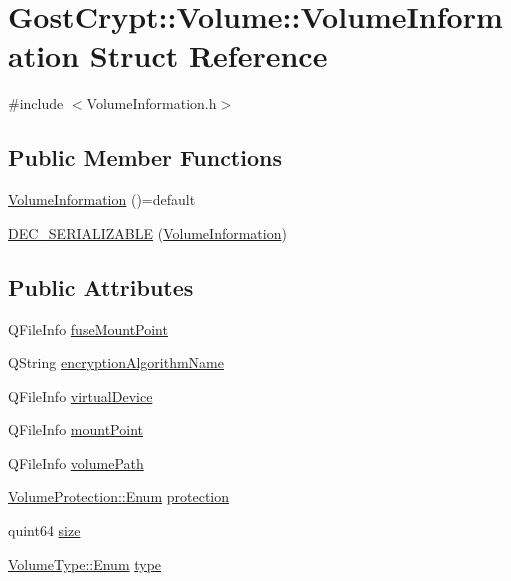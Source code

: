 \hypertarget{struct_gost_crypt_1_1_volume_1_1_volume_information}{}\section{Gost\+Crypt\+:\+:Volume\+:\+:Volume\+Information Struct Reference}
\label{struct_gost_crypt_1_1_volume_1_1_volume_information}


{\ttfamily \#include $<$Volume\+Information.\+h$>$}

\subsection*{Public Member Functions}
\begin{DoxyCompactItemize}
\item 
\hyperlink{struct_gost_crypt_1_1_volume_1_1_volume_information_a483f7b309d7dbb9f70a737bef225ca9f}{Volume\+Information} ()=default
\item 
\hyperlink{struct_gost_crypt_1_1_volume_1_1_volume_information_a4994b4f5366da728867050f990e24d9c}{D\+E\+C\+\_\+\+S\+E\+R\+I\+A\+L\+I\+Z\+A\+B\+LE} (\hyperlink{struct_gost_crypt_1_1_volume_1_1_volume_information}{Volume\+Information})
\end{DoxyCompactItemize}
\subsection*{Public Attributes}
\begin{DoxyCompactItemize}
\item 
Q\+File\+Info \hyperlink{struct_gost_crypt_1_1_volume_1_1_volume_information_a0a0f7d679d28719c3d2db31c581fc7d5}{fuse\+Mount\+Point}
\item 
Q\+String \hyperlink{struct_gost_crypt_1_1_volume_1_1_volume_information_a25e8edddd6646353000a54cffa6d8f82}{encryption\+Algorithm\+Name}
\item 
Q\+File\+Info \hyperlink{struct_gost_crypt_1_1_volume_1_1_volume_information_a04d575e85da666853af68cf90a47f5d7}{virtual\+Device}
\item 
Q\+File\+Info \hyperlink{struct_gost_crypt_1_1_volume_1_1_volume_information_a0480db5ae85a69729457936bb377e2b4}{mount\+Point}
\item 
Q\+File\+Info \hyperlink{struct_gost_crypt_1_1_volume_1_1_volume_information_a7c6d926659681092d8f4b6f8e6898629}{volume\+Path}
\item 
\hyperlink{struct_gost_crypt_1_1_volume_1_1_volume_protection_a8dd7301af256c893dc1e0a08c7530c7f}{Volume\+Protection\+::\+Enum} \hyperlink{struct_gost_crypt_1_1_volume_1_1_volume_information_ae337bdbf80c2f26b72df58ec615664fb}{protection}
\item 
quint64 \hyperlink{struct_gost_crypt_1_1_volume_1_1_volume_information_a7bbff1dabd004fab01b7ec85e4252925}{size}
\item 
\hyperlink{struct_gost_crypt_1_1_volume_1_1_volume_type_a7fe1979dab76d4534dcb1e26179d4717}{Volume\+Type\+::\+Enum} \hyperlink{struct_gost_crypt_1_1_volume_1_1_volume_information_a80af03399f5215d91b29190a26b61391}{type}
\end{DoxyCompactItemize}


